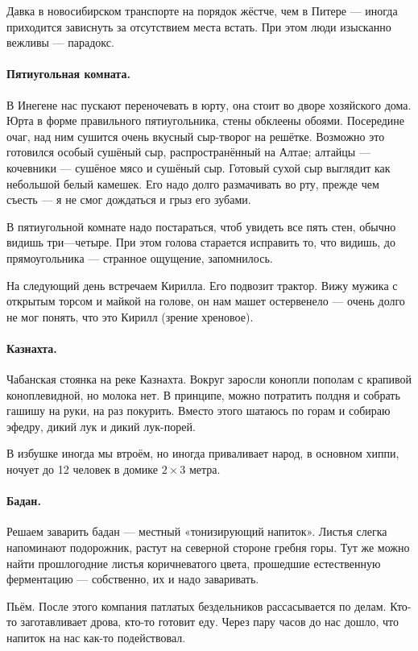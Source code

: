 \documentclass{book}
\begin{document}
Давка в новосибирском транспорте на порядок жёстче, чем в Питере --- иногда приходится зависнуть за отсутствием места встать.
При этом люди изысканно вежливы --- парадокс.

\paragraph{Пятиугольная комната.}
В Инегене нас пускают переночевать в юрту, она стоит во дворе хозяйского дома.
Юрта в форме правильного пятиугольника, стены обклеены обоями.
Посередине очаг, над ним сушится очень вкусный сыр-творог на решётке.
Возможно это готовился особый сушёный сыр, распространённый на Алтае;
алтайцы --- кочевники --- сушёное мясо и сушёный сыр.
Готовый сухой сыр выглядит как небольшой белый камешек.
Его надо долго размачивать во рту, прежде чем съесть --- я не смог дождаться и грыз его зубами.

В пятиугольной комнате надо постараться, чтоб увидеть все пять стен,
обычно видишь три---четыре.
При этом голова старается исправить то, что видишь, до прямоугольника --- странное ощущение, запомнилось.

На следующий день встречаем Кирилла.
Его подвозит трактор.
Вижу мужика с открытым торсом и майкой на голове, он нам машет остервенело --- очень долго не мог понять, что это Кирилл (зрение хреновое).

\paragraph{Казнахта.}
Чабанская стоянка на реке Казнахта.
Вокруг заросли конопли пополам с крапивой коноплевидной, но молока нет.
В принципе, можно потратить полдня и собрать гашишу на руки, на раз покурить.
Вместо этого шатаюсь по горам и собираю эфедру, дикий лук и дикий лук-порей.

В избушке иногда мы втроём, но иногда приваливает народ, в основном хиппи,
ночует до 12 человек в домике $2{\times}3$ метра.

\paragraph{Бадан.}
Решаем заварить бадан --- местный «тонизирующий напиток».
Листья слегка напоминают подорожник, растут на северной стороне гребня горы.
Тут же можно найти прошлогодние листья коричневатого цвета, прошедшие естественную ферментацию --- собственно, их и надо заваривать.

Пьём.
После этого компания патлатых бездельников рассасывается по делам.
Кто-то заготавливает дрова, кто-то готовит еду.
Через пару часов до нас дошло, что напиток на нас как-то подействовал.
\end{document}
